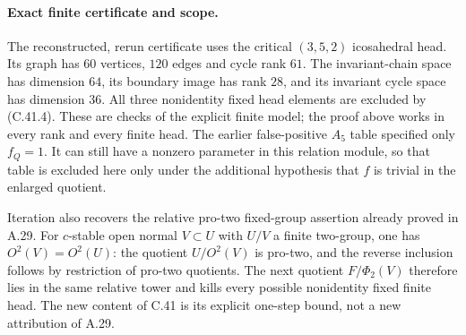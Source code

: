 \paragraph{Exact finite certificate and scope.}
The reconstructed, rerun certificate
uses the critical $(3,5,2)$ icosahedral head. Its graph has $60$
vertices, $120$ edges and cycle rank $61$. The invariant-chain
space has dimension $64$, its boundary image has rank $28$, and
its invariant cycle space has dimension $36$. All three
nonidentity fixed head elements are excluded by (C.41.4).
These are checks of the explicit finite model; the proof above
works in every rank and every finite head.
The earlier false-positive $A_5$ table specified only $f_Q=1$.
It can still have a nonzero parameter in this relation module,
so that table is excluded here only under the additional hypothesis
that $f$ is trivial in the enlarged quotient.

Iteration also recovers the relative pro-two fixed-group assertion
already proved in A.29. For $c$-stable open normal $V\subset U$
with $U/V$ a finite two-group, one has $O^2(V)=O^2(U)$: the quotient
$U/O^2(V)$ is pro-two, and the reverse inclusion follows by
restriction of pro-two quotients. The next quotient
$F/\Phi_2(V)$ therefore lies in the same relative tower and kills
every possible nonidentity fixed finite head. The new content of
C.41 is its explicit one-step bound, not a new attribution of A.29.
